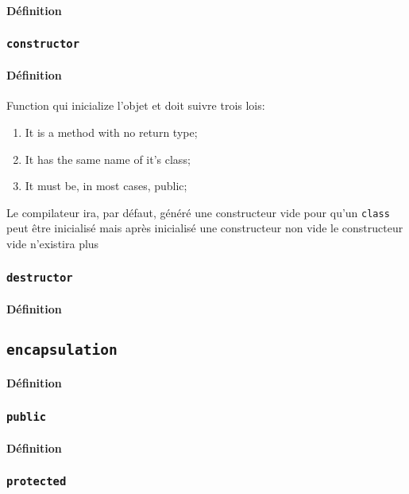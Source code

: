 \documentclass{article}
\begin{document}
\paragraph{Définition}

\subsubsection{\texttt{constructor}}
\paragraph{Définition}Function qui inicialize l'objet et doit suivre trois lois:
\begin{enumerate}[noitemsep]
    \item It is a method with no return type;
    \item It has the same name of it's class;
    \item It must be, in most cases, public;
\end{enumerate}
Le compilateur ira, par défaut, généré une constructeur vide pour qu'un \texttt{class} peut être inicialisé mais après inicialisé une constructeur non vide le constructeur vide n'existira plus

\subsubsection{\texttt{destructor}}
\paragraph{Définition}

\subsection{\texttt{encapsulation}}
\paragraph{Définition}

\subsubsection{\texttt{public}}
\paragraph{Définition}

\subsubsection{\texttt{protected}}
\end{document}
